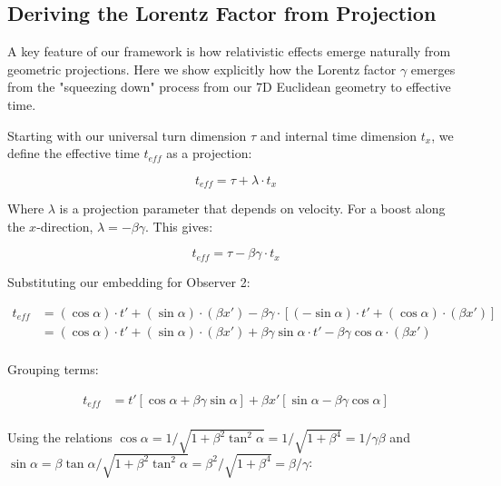 \documentclass{article}
\begin{document}
\subsection{Deriving the Lorentz Factor from Projection}

A key feature of our framework is how relativistic effects emerge naturally from geometric projections. Here we show explicitly how the Lorentz factor $\gamma$ emerges from the "squeezing down" process from our 7D Euclidean geometry to effective time.

Starting with our universal turn dimension $\tau$ and internal time dimension $t_x$, we define the effective time $t_{eff}$ as a projection:

\begin{equation}
t_{eff} = \tau + \lambda \cdot t_x
\end{equation}

Where $\lambda$ is a projection parameter that depends on velocity. For a boost along the $x$-direction, $\lambda = -\beta\gamma$. This gives:

\begin{equation}
t_{eff} = \tau - \beta\gamma \cdot t_x
\end{equation}

Substituting our embedding for Observer 2:

\begin{equation}
\begin{aligned}
t_{eff} &= (\cos\alpha) \cdot t' + (\sin\alpha) \cdot (\beta x') - \beta\gamma \cdot [(-\sin\alpha) \cdot t' + (\cos\alpha) \cdot (\beta x')] \\
&= (\cos\alpha) \cdot t' + (\sin\alpha) \cdot (\beta x') + \beta\gamma\sin\alpha \cdot t' - \beta\gamma\cos\alpha \cdot (\beta x') \\
\end{aligned}
\end{equation}

Grouping terms:

\begin{equation}
\begin{aligned}
t_{eff} &= t'[\cos\alpha + \beta\gamma\sin\alpha] + \beta x'[\sin\alpha - \beta\gamma\cos\alpha] \\
\end{aligned}
\end{equation}

Using the relations $\cos\alpha = 1/\sqrt{1+\beta^2\tan^2\alpha} = 1/\sqrt{1+\beta^4} = 1/\gamma\beta$ and $\sin\alpha = \beta\tan\alpha/\sqrt{1+\beta^2\tan^2\alpha} = \beta^2/\sqrt{1+\beta^4} = \beta/\gamma$:
\end{document}
